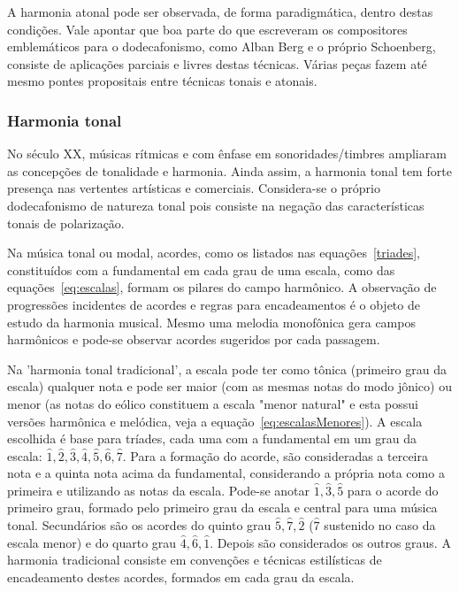 A harmonia atonal pode ser observada, de forma paradigmática, dentro destas condições.
Vale apontar que boa parte do que escreveram os compositores
emblemáticos para o dodecafonismo, como Alban Berg e o próprio Schoenberg, consiste de
aplicações parciais e livres destas técnicas. Várias peças fazem até mesmo pontes
propositais entre técnicas tonais e atonais.

\subsubsection{Harmonia tonal}
No século XX, músicas rítmicas
e com ênfase em sonoridades/timbres ampliaram 
as concepções de tonalidade e harmonia. Ainda assim, a harmonia tonal tem forte presença
nas vertentes artísticas e comerciais. Considera-se o próprio dodecafonismo de natureza
tonal pois consiste na negação das características tonais de polarização.

Na música tonal ou modal, acordes, como os listados nas equações~\ref{triades}, constituídos com a fundamental em cada
grau de uma escala, como das equações~\ref{eq:escalas}, formam os pilares do campo harmônico.
A observação de progressões incidentes de acordes e regras para encadeamentos é o objeto de estudo da harmonia musical.
Mesmo uma melodia monofônica gera campos harmônicos e pode-se observar acordes sugeridos por cada passagem.



Na 'harmonia tonal tradicional',
a escala pode ter como tônica (primeiro grau da escala) qualquer nota e pode ser maior (com as mesmas notas do modo jônico) ou menor (as notas do eólico constituem a escala "menor natural" e esta possui versões harmônica e melódica, veja a equação~\ref{eq:escalasMenores}). A escala escolhida é
base para tríades, cada uma com a fundamental em um grau 
da escala: $\hat{1},\hat{2},\hat{3},\hat{4},\hat{5},\hat{6},\hat{7}$. Para a formação do acorde, são consideradas a terceira nota e a quinta nota acima da fundamental, considerando a própria nota como a primeira e utilizando as notas da escala.
Pode-se anotar $\hat{1},\hat{3},\hat{5}$ para o acorde do primeiro grau, formado pelo primeiro grau da escala e central para uma música tonal. Secundários são os acordes do quinto grau $\hat{5},\hat{7},\hat{2}$ ($\hat{7}$ sustenido no caso da escala menor) e do quarto grau $\hat{4},\hat{6},\hat{1}$. Depois são considerados os outros graus. A harmonia tradicional consiste em convenções e técnicas estilísticas de encadeamento destes acordes, formados em cada grau da escala.\cite{Harmonia}

